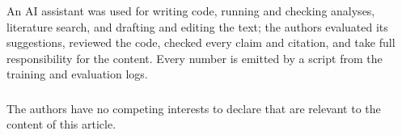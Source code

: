 \documentclass[runningheads]{llncs}
\begin{document}
\begin{credits}
\subsubsection{\ackname} An AI assistant was used for writing code, running and checking
analyses, literature search, and drafting and editing the text; the authors evaluated
its suggestions, reviewed the code, checked every claim and citation, and take full
responsibility for the content. Every number is emitted by a script from the training
and evaluation logs.

\subsubsection{\discintname} The authors have no competing interests to declare that
are relevant to the content of this article.
\end{credits}



\end{document}
